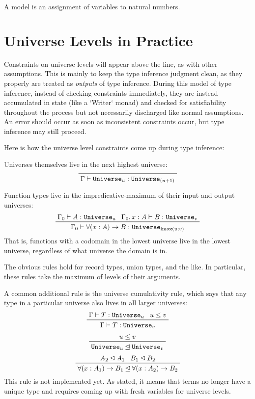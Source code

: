 \documentclass[11pt, twoside, reqno]{book}
\DeclareMathOperator{\imax}{imax}
\newcommand{\subsumedBy}{\unlhd}
\begin{document}
A model is an assignment of variables to natural numbers.

\section{Universe Levels in Practice}
\label{uni-lvl-prac}

Constraints on universe levels will appear above the line, as with other assumptions.
This is mainly to keep the type inference judgment clean, as they properly are treated as \emph{outputs} of type inference.
During this model of type inference, instead of checking constraints immediately, they are instead accumulated in state (like a \inHS`Writer` monad) and checked for satisfiability throughout the process but not necessarily discharged like normal assumptions.
An error should occur as soon as inconsistent constraints occur, but type inference may still proceed.

Here is how the universe level constraints come up during type inference:

Universes themselves live in the next highest universe:
\begin{displaymath}
\prftree{\Gamma \vdash \texttt{Universe}_u : \texttt{Universe}_{(u+1)}}
\end{displaymath}

Function types live in the impredicative-maximum of their input and output universes:
\begin{displaymath}
\prftree
  {\Gamma_0 \vdash A : \texttt{Universe}_u}
  {\Gamma_0, x : A \vdash B : \texttt{Universe}_v}
  {\Gamma_0 \vdash \forall (x : A) \to B : \texttt{Universe}_{\imax(u; v)}}
\end{displaymath}
That is, functions with a codomain in the lowest universe live in the lowest universe, regardless of what universe the domain is in.

The obvious rules hold for record types, union types, and the like.
In particular, these rules take the maximum of levels of their arguments.

A common additional rule is the universe cumulativity rule, which says that any type in a particular universe also lives in all larger universes:
\begin{displaymath}
\prftree{\Gamma \vdash T : \texttt{Universe}_u}{u \le v}{\Gamma \vdash T : \texttt{Universe}_v}
\end{displaymath}
\begin{displaymath}
\prftree{u \le v}{\texttt{Universe}_u \subsumedBy \texttt{Universe}_v}
\end{displaymath}
\begin{displaymath}
\prftree{A_2 \subsumedBy A_1}{B_1 \subsumedBy B_2}{\forall(x : A_1) \to B_1 \subsumedBy \forall(x : A_2) \to B_2}
\end{displaymath}
This rule is not implemented yet.
As stated, it means that terms no longer have a unique type and requires coming up with fresh variables for universe levels.
\end{document}
